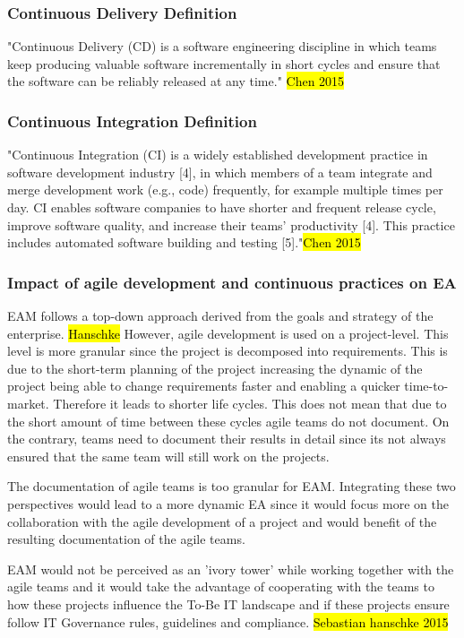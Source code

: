 \subsubsection{Continuous Delivery Definition}
"Continuous Delivery (CD) is a software engineering discipline in which teams keep producing valuable software incrementally in short cycles and ensure that the software can be reliably released at any time." \hl{Chen 2015}

\subsubsection{Continuous Integration Definition}
"Continuous Integration (CI) is a widely established
development practice in software development industry [4],
in which members of a team integrate and merge development
work (e.g., code) frequently, for example multiple
times per day. CI enables software companies to have shorter
and frequent release cycle, improve software quality, and
increase their teams' productivity [4]. This practice includes
automated software building and testing [5]."\hl{Chen 2015}

\subsubsection{Impact of agile development and continuous practices on EA}
EAM follows a top-down approach derived from the goals and strategy of the enterprise. \hl{Hanschke} However, agile development is used on a project-level. This level is more granular since the project is decomposed into requirements. This is due to the short-term planning of the project increasing the dynamic of the project being able to change requirements faster and enabling a quicker time-to-market. Therefore it leads to shorter life cycles. This does not mean that due to the short amount of time between these cycles agile teams do not document. On the contrary, teams need to document their results in detail since its not always ensured that the same team will still work on the projects.

The documentation of agile teams is too granular for EAM. Integrating these two perspectives would lead to a more dynamic EA since it would focus more on the collaboration with the agile development of a project and would benefit of the resulting documentation of the agile teams. 

EAM would not be perceived as an 'ivory tower' while working together with the agile teams and it would take the advantage of cooperating with the teams to how these projects influence the To-Be IT landscape and if these projects ensure follow IT Governance rules, guidelines and compliance. \hl{Sebastian hanschke 2015}


